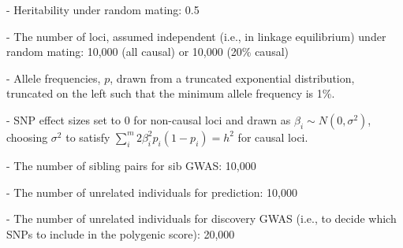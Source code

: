 \documentclass[hidelinks, 12pt]{article}
\begin{document}
- Heritability under random mating: 0.5

- The number of loci, assumed independent (i.e., in linkage equilibrium) under random mating: 10,000 (all causal) or 10,000 (20\% causal)

- Allele frequencies, $p$, drawn from a truncated exponential distribution, truncated on the left such that the minimum allele frequency is 1\%.

- SNP effect sizes set to 0 for non-causal loci and drawn as $\beta_i\sim N(0,\sigma^2)$, choosing $\sigma^2$ to satisfy $\sum_i^m2\beta_i^2p_i(1-p_i)=h^2$ for causal loci.

- The number of sibling pairs for sib GWAS: 10,000

- The number of unrelated individuals for prediction: 10,000

- The number of unrelated individuals for discovery GWAS (i.e., to decide which SNPs to include in the polygenic score): 20,000
\end{document}
